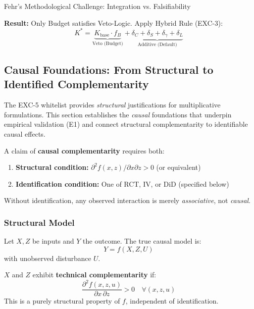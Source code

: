 \begin{chapter}{Fehr's Methodological Challenge: Integration vs. Falsifiability}
\begin{example}
\textbf{Result:} Only Budget satisfies Veto-Logic. Apply Hybrid Rule (EXC-3):
\begin{equation}
K^* = \underbrace{K_{\text{base}} \cdot f_B}_{\text{Veto (Budget)}} + \underbrace{\delta_C + \delta_S + \delta_\gamma + \delta_L}_{\text{Additive (Default)}}
\end{equation}
\end{example}

\subsection{Causal Foundations: From Structural to Identified Complementarity}
\label{sec:causal-complementarity}

The EXC-5 whitelist provides \textit{structural} justifications for multiplicative formulations. This section establishes the \textit{causal} foundations that underpin empirical validation (E1) and connect structural complementarity to identifiable causal effects.

\begin{axiom}
\label{ax:exc-6}
A claim of \textbf{causal complementarity} requires both:
\begin{enumerate}[noitemsep]
    \item \textbf{Structural condition:} $\partial^2 f(x,z)/\partial x \partial z > 0$ (or equivalent)
    \item \textbf{Identification condition:} One of RCT, IV, or DiD (specified below)
\end{enumerate}
Without identification, any observed interaction is merely \textit{associative}, not \textit{causal}.
\end{axiom}

\subsubsection{Structural Model}

Let $X, Z$ be inputs and $Y$ the outcome. The true causal model is:
\begin{equation}
Y = f(X, Z, U)
\end{equation}
with unobserved disturbance $U$.

\begin{definition}
\label{def:technical-complementarity}
$X$ and $Z$ exhibit \textbf{technical complementarity} if:
\begin{equation}
\frac{\partial^2 f(x,z,u)}{\partial x\,\partial z} > 0 \quad \forall (x,z,u)
\end{equation}
This is a purely structural property of $f$, independent of identification.
\end{definition}


\end{chapter}
